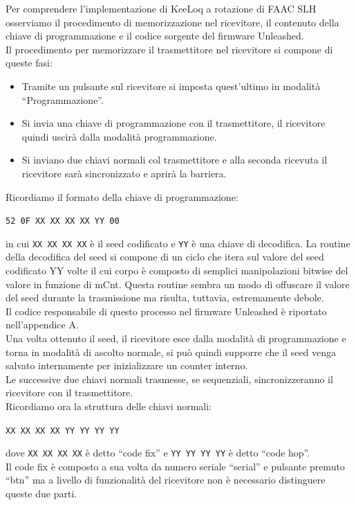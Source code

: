 Per comprendere l’implementazione di KeeLoq a rotazione di FAAC SLH osserviamo il procedimento di memorizzazione nel ricevitore, il contenuto della chiave di programmazione e il codice sorgente del firmware Unleashed.\\
Il procedimento per memorizzare il trasmettitore nel ricevitore si compone di queste fasi:
\begin{itemize}
  \item Tramite un pulsante sul ricevitore si imposta quest’ultimo in modalità “Programmazione”.
  \item Si invia una chiave di programmazione con il trasmettitore, il ricevitore quindi uscirà dalla modalità programmazione.
  \item Si inviano due chiavi normali col trasmettitore e alla seconda ricevuta il ricevitore sarà sincronizzato e aprirà la barriera.
\end{itemize}
Ricordiamo il formato della chiave di programmazione:
\begin{center}
  \texttt{52 0F XX XX XX XX YY 00}
\end{center}
in cui \texttt{XX XX XX XX} è il seed codificato e \texttt{YY} è una chiave di decodifica.
La routine della decodifica del seed si compone di un ciclo che itera sul valore del seed codificato YY volte il cui corpo è composto di semplici manipolazioni bitwise del valore in funzione di mCnt. Questa routine sembra un modo di offuscare il valore del seed durante la trasmissione ma risulta, tuttavia, estremamente debole.\\
Il codice responsabile di questo processo nel firmware Unleashed è riportato nell'appendice A.\\
Una volta ottenuto il seed, il ricevitore esce dalla modalità di programmazione e torna in modalità di ascolto normale, si può quindi supporre che il seed venga salvato internamente per inizializzare un counter interno.\\
Le successive due chiavi normali trasmesse, se sequenziali, sincronizzeranno il ricevitore con il trasmettitore.\\
Ricordiamo ora la struttura delle chiavi normali:
\begin{center}
  \texttt{XX XX XX XX YY YY YY YY}
\end{center}
dove \texttt{XX XX XX XX} è detto “code fix” e \texttt{YY YY YY YY} è detto “code hop”.\\
Il code fix è composto a sua volta da numero seriale “serial” e pulsante premuto “btn” ma a livello di funzionalità del ricevitore non è necessario distinguere queste due parti.\\
